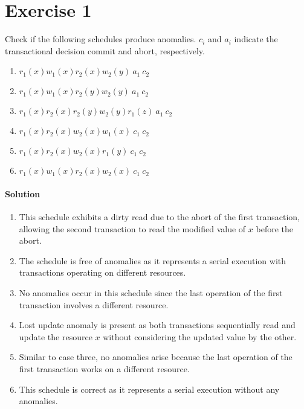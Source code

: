 \section{Exercise 1}

Check if the following schedules produce anomalies. 
$c_i$ and $a_i$ indicate the transactional decision commit and abort, respectively.
\begin{enumerate}
    \item $r_1(x) w_1(x) r_2(x) w_2(y)\:a_1\:c_2$
    \item $r_1(x) w_1(x) r_2(y) w_2(y)\:a_1\:c_2$
    \item $r_1(x) r_2(x) r_2(y) w_2(y) r_1(z)\:a_1\:c_2$
    \item $r_1(x) r_2(x) w_2(x) w_1(x)\:c_1\:c_2$
    \item $r_1(x) r_2(x) w_2(x) r_1(y)\:c_1\:c_2$
    \item $r_1(x) w_1(x) r_2(x) w_2(x)\:c_1\:c_2$
\end{enumerate}

\paragraph*{Solution}
\begin{enumerate}
    \item This schedule exhibits a dirty read due to the abort of the first transaction, allowing the second transaction to read the modified value of $x$ before the abort.
    \item The schedule is free of anomalies as it represents a serial execution with transactions operating on different resources.
    \item No anomalies occur in this schedule since the last operation of the first transaction involves a different resource.
    \item Lost update anomaly is present as both transactions sequentially read and update the resource $x$ without considering the updated value by the other.
    \item Similar to case three, no anomalies arise because the last operation of the first transaction works on a different resource.
    \item This schedule is correct as it represents a serial execution without any anomalies.
\end{enumerate}